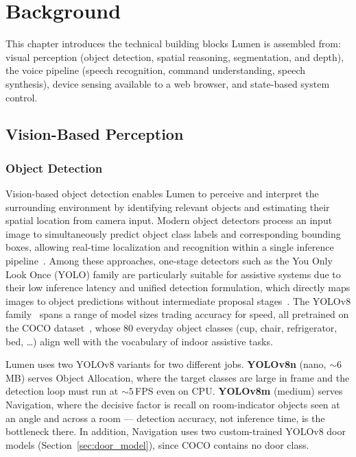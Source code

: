 \chapter{Background}
\label{ch:background}

This chapter introduces the technical building blocks Lumen is assembled from: visual
perception (object detection, spatial reasoning, segmentation, and depth), the voice
pipeline (speech recognition, command understanding, speech synthesis), device
sensing available to a web browser, and state-based system control.

\section{Vision-Based Perception}

\subsection{Object Detection}

Vision-based object detection enables Lumen to perceive and interpret the surrounding
environment by identifying relevant objects and estimating their spatial location
from camera input. Modern object detectors process an input image to simultaneously
predict object class labels and corresponding bounding boxes, allowing real-time
localization and recognition within a single inference
pipeline~\cite{girshick2015fast}. Among these approaches, one-stage detectors such as
the You Only Look Once (YOLO) family are particularly suitable for assistive systems
due to their low inference latency and unified detection formulation, which directly
maps images to object predictions without intermediate proposal
stages~\cite{redmon2016yolo}. The YOLOv8 family~\cite{jocher2023yolov8} spans a range
of model sizes trading accuracy for speed, all pretrained on the COCO
dataset~\cite{lin2014coco}, whose 80 everyday object classes (cup, chair,
refrigerator, bed, \ldots) align well with the vocabulary of indoor assistive tasks.

Lumen uses two YOLOv8 variants for two different jobs. \textbf{YOLOv8n} (nano, ${\sim}6$\,MB)
serves Object Allocation, where the target classes are large in frame and the
detection loop must run at ${\sim}5$\,FPS even on CPU. \textbf{YOLOv8m} (medium)
serves Navigation, where the decisive factor is recall on room-indicator objects seen
at an angle and across a room --- detection accuracy, not inference time, is the
bottleneck there. In addition, Navigation uses two custom-trained YOLOv8 door models
(Section~\ref{sec:door_model}), since COCO contains no door class.

